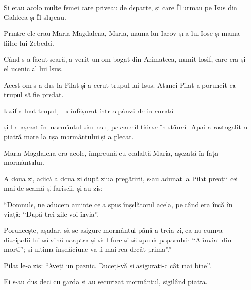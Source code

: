 {\par }{\PP {}Și erau acolo multe femei care priveau de departe, și care Îl urmau pe Isus din Galileea și Îl slujeau.

Printre ele erau Maria Magdalena, Maria, mama lui Iacov și a lui Iose și mama fiilor lui Zebedei.


\par }{\PP {}Când s-a făcut seară, a venit un om bogat din Arimateea, numit Iosif, care era și el ucenic al lui Isus.

Acest om s-a dus la Pilat și a cerut trupul lui Isus. Atunci Pilat a poruncit ca trupul să fie predat.

Iosif a luat trupul, l-a înfășurat într-o pânză de in curată

și l-a așezat în mormântul său nou, pe care îl tăiase în stâncă. Apoi a rostogolit o piatră mare la ușa mormântului și a plecat.

Maria Magdalena era acolo, împreună cu cealaltă Maria, așezată în fața mormântului.


\par }{\PP {}A doua zi, adică a doua zi după ziua pregătirii, s-au adunat la Pilat preoții cei mai de seamă și fariseii, și au zis:

“Domnule, ne aducem aminte ce a spus înșelătorul acela, pe când era încă în viață: “După trei zile voi învia”.

Poruncește, așadar, să se asigure mormântul până a treia zi, ca nu cumva discipolii lui să vină noaptea și să-l fure și să spună poporului: “A înviat din morți”; și ultima înșelăciune va fi mai rea decât prima”.”


\par }{\PP {}Pilat le-a zis: “Aveți un paznic. Duceți-vă și asigurați-o cât mai bine”.

Ei s-au dus deci cu garda și au securizat mormântul, sigilând piatra.



\par }
